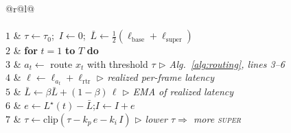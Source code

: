 \begin{algorithm}[t]
\caption{PI latency-budget control of the threshold $\tau$}
\label{alg:budget}
\small
\begin{tabular}{@{}r@{\hspace{5pt}}l@{}}
\\
\\[1pt]
$1$ & $\tau\leftarrow\tau_0$;\;\, $I\leftarrow0$;\;\, $\bar{L}\leftarrow\tfrac12(\ell_{\mathrm{base}}{+}\ell_{\mathrm{super}})$\\
$2$ & \textbf{for} $t=1$ \textbf{to} $T$ \textbf{do}\\
$3$ & \quad $a_t\leftarrow$ route $x_t$ with threshold $\tau$ \hfill{\footnotesize\itshape $\triangleright$ Alg.~\ref{alg:routing}, lines 3--6}\\
$4$ & \quad $\ell\leftarrow\ell_{a_t}+\ell_{\mathrm{rtr}}$ \hfill{\footnotesize\itshape $\triangleright$ realized per-frame latency}\\
$5$ & \quad $\bar{L}\leftarrow\beta\bar{L}+(1{-}\beta)\,\ell$ \hfill{\footnotesize\itshape $\triangleright$ EMA of realized latency}\\
$6$ & \quad $e\leftarrow L^\star(t)-\bar{L}$;\quad $I\leftarrow I+e$\\
$7$ & \quad $\tau\leftarrow\mathrm{clip}(\tau-k_p\,e-k_i\,I)$ \hfill{\footnotesize\itshape $\triangleright$ lower $\tau\Rightarrow$ more \textsc{super}}\\
\end{tabular}
\end{algorithm}